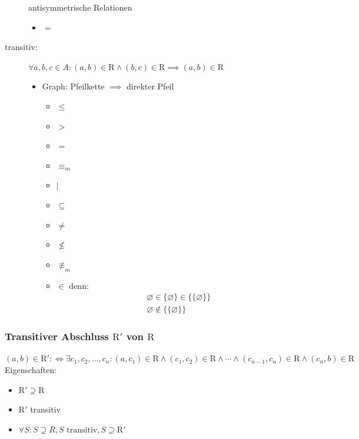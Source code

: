 \begin{description}
\begin{bsp*}{antisymmetrische Relationen}
\begin{itemize}
				\item $=$
			\end{itemize}
		\end{bsp*}
	\item[transitiv:] $\forall a , b , c \in A : (a , b) \in \mathrm{R} \wedge (b , c) \in \mathrm{R} \implies (a , b) \in \mathrm{R}$\\
		\begin{itemize}
			\item Graph: Pfeilkette $\implies$ direkter Pfeil \\
			\begin{bsp*}[note = transitive Relationen]
				\begin{itemize}
					\item $\leq$
					\item$>$
					\item $=$
					\item $\equiv_m$
					\item $|$
					\item $\subseteq$
				\end{itemize}
			\end{bsp*}
			\begin{bsp*}[note = nicht transitive Relationen]
				\begin{itemize}
					\item $\neq$
					\item $\not\leq$
					\item $\not\equiv_m$
					\item $\in$ denn: \\
						\begin{gather*}
							\varnothing \in \{ \varnothing \} \in \{ \{ \varnothing \} \} \\
							\varnothing \notin \{ \{ \varnothing \} \}
						\end{gather*}
				\end{itemize}
			\end{bsp*}
		\end{itemize}
\end{description}

\subsubsection{Transitiver Abschluss \texorpdfstring{$\mathrm{R}'$}{R'} von \texorpdfstring{$\mathrm{R}$}{R}}
$(a , b) \in \mathrm{R}' :\iff \exists c_1 , c_2 , \dotsc , c_n : (a , c_1) \in \mathrm{R} \wedge (c_1 , c_2) \in \mathrm{R} \wedge \dotsb \wedge (c_{n-1} , c_n) \in \mathrm{R} \wedge (c_n , b) \in \mathrm{R}$ \\
Eigenschaften:\\
\begin{itemize}
	\item $\mathrm{R}' \supseteq \mathrm{R}$
	\item $\mathrm{R}'$ transitiv
	\item $\forall S : S \supseteq R , S \text{ transitiv}, S \supseteq \mathrm{R}'$
\end{itemize}
